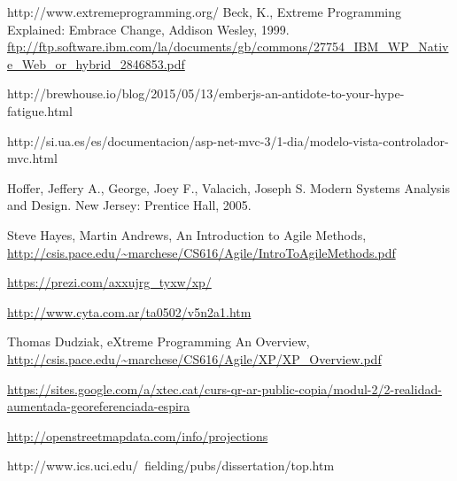 \begin{thebibliography}{99}
	 http://www.extremeprogramming.org/
	 Beck, K., Extreme Programming Explained: Embrace Change, Addison Wesley, 1999.
	  \url{ftp://ftp.software.ibm.com/la/documents/gb/commons/27754_IBM_WP_Native_Web_or_hybrid_2846853.pdf}

	 http://brewhouse.io/blog/2015/05/13/emberjs-an-antidote-to-your-hype-fatigue.html

	 http://si.ua.es/es/documentacion/asp-net-mvc-3/1-dia/modelo-vista-controlador-mvc.html

	 Hoffer, Jeffery A., George, Joey F., Valacich, Joseph S. Modern Systems Analysis and Design. New Jersey: Prentice Hall, 2005.

	 Steve Hayes, Martin Andrews, An Introduction to Agile Methods, \url{http://csis.pace.edu/~marchese/CS616/Agile/IntroToAgileMethods.pdf}




	 \url{https://prezi.com/axxujrg_tyxw/xp/}

	 \url{http://www.cyta.com.ar/ta0502/v5n2a1.htm}

	 Thomas Dudziak, eXtreme Programming
An Overview, \url{http://csis.pace.edu/~marchese/CS616/Agile/XP/XP_Overview.pdf}

	 \url{https://sites.google.com/a/xtec.cat/curs-qr-ar-public-copia/modul-2/2-realidad-aumentada-georeferenciada-espira}

	 \url{http://openstreetmapdata.com/info/projections}



	 http://www.ics.uci.edu/~fielding/pubs/dissertation/top.htm


\end{thebibliography}
